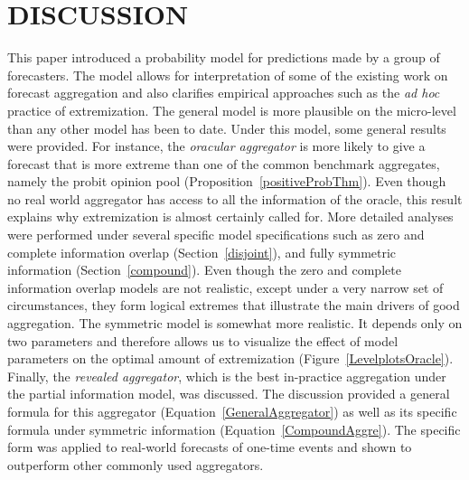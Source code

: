 \documentclass[12pt]{article}
\theoremstyle{definition}
\theoremstyle{definition}
\begin{document}
\section{DISCUSSION}
\label{discussion}
This paper introduced a probability model for predictions made by
a group of forecasters.  The model allows for interpretation of some
of the existing work on forecast aggregation and also clarifies
empirical approaches such as the {\em ad hoc} practice of
extremization.  The general model is more plausible on the micro-level
than any other model has been to date. Under this model, 
some general results were provided. For instance, the
\textit{oracular aggregator} is more likely to give a forecast that is
more extreme than one of the common benchmark aggregates, namely the
probit opinion pool (Proposition~\ref{positiveProbThm}).  Even though
no real world aggregator has access to all the information of the
oracle, this result explains why extremization is almost certainly
called for.  More detailed analyses  were performed under several
specific model specifications such as zero and complete information
overlap (Section~\ref{disjoint}), and fully symmetric information (Section~\ref{compound}).  Even though the zero and complete
information overlap models are not realistic, except under a very
narrow set of circumstances, they form logical extremes that illustrate the main drivers of good aggregation. The symmetric model is somewhat
more realistic. It depends only on two parameters and therefore allows us to visualize the effect of model parameters on the optimal amount of
extremization (Figure~\ref{LevelplotsOracle}).  Finally, the
{\em revealed aggregator}, which is the best in-practice aggregation
under the partial information model, was discussed. The discussion provided a general formula for
this aggregator (Equation~\ref{GeneralAggregator}) as well as its
specific formula under symmetric information
(Equation~\ref{CompoundAggre}). The specific form was applied to real-world forecasts 
of one-time events and shown to 
outperform other commonly used aggregators. 
\end{document}
